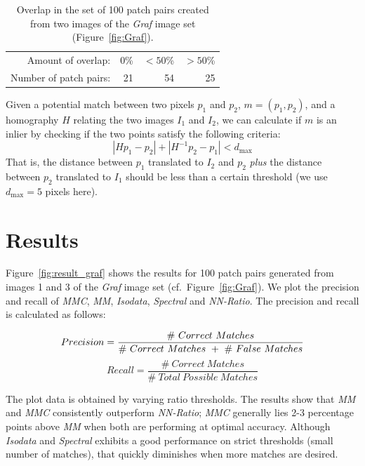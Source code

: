 \documentclass[conference]{IEEEtran}
\begin{document}
\begin{table}[htb]
\caption{Overlap in the set of 100 patch pairs created from two images of the \emph{Graf} image set (Figure~\ref{fig:Graf}).}
\label{table:overlap}
	\centering
\begin{tabular}{r*{3}{r}}
\hline
	Amount of overlap: & 0\% & $< 50$\% & $> 50$\%  \\
	\noalign{\smallskip}
	Number of patch pairs: & 21 & 54 & 25 \\
	\hline
\end{tabular}
\end{table}


Given a potential match between two pixels $p_1$ and 
$p_2$, $m = \left(p_1, p_2\right)$, and a homography $H$ relating the two images $I_1$ and $I_2$, we 
can calculate if $m$ is an inlier by checking if the two points satisfy the following criteria:
\begin{equation*}
\left\vert H p_1 - p_2 \right\vert + \left\vert H^{-1}p_2 - p_1 \right\vert < d_{\max}
\end{equation*}
That is, the distance between $p_1$ translated to $I_2$ and $p_2$ 
\emph{plus} the distance between $p_2$ translated to $I_1$ should be 
less than a certain threshold (we use $d_{\max}=5$ pixels here).


\section{Results}
\label{S:Results}

Figure~\ref{fig:result_graf} shows the results for 100 patch pairs 
generated from images 1 and 3 of the \emph{Graf} image set 
(cf.~Figure~\ref{fig:Graf}). We plot the precision and recall of 
\emph{MMC}, \emph{MM}, \emph{Isodata}, \emph{Spectral} and 
\emph{NN-Ratio}. The precision and recall is calculated as follows:

\begin{equation*}
    Precision = \frac{\# ~ Correct ~ Matches}{\# ~ Correct ~ Matches ~ + 
    ~ \# ~ False ~ Matches} \\
\end{equation*}
\begin{equation*}
    Recall = \frac{\# ~ Correct ~ Matches}{\# ~ Total ~ Possible ~
    Matches}
\end{equation*}

The plot data is obtained by varying ratio thresholds.  The results show 
that \emph{MM} and \emph{MMC} consistently outperform \emph{NN-Ratio}; 
\emph{MMC} generally lies 2-3 percentage points above \emph{MM} when 
both are performing at optimal accuracy.  Although \emph{Isodata} and 
\emph{Spectral} exhibits a good performance on strict thresholds (small 
number of matches), that quickly diminishes when more matches are 
desired.
\end{document}
